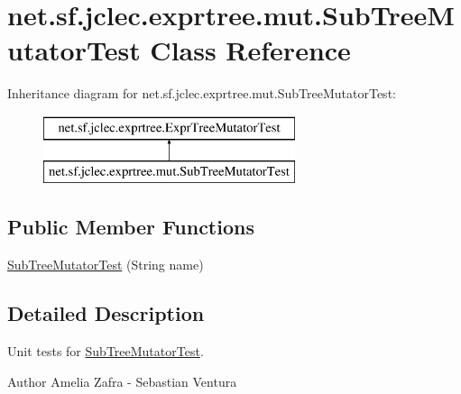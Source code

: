 \hypertarget{classnet_1_1sf_1_1jclec_1_1exprtree_1_1mut_1_1_sub_tree_mutator_test}{\section{net.\-sf.\-jclec.\-exprtree.\-mut.\-Sub\-Tree\-Mutator\-Test Class Reference}
\label{classnet_1_1sf_1_1jclec_1_1exprtree_1_1mut_1_1_sub_tree_mutator_test}
}
Inheritance diagram for net.\-sf.\-jclec.\-exprtree.\-mut.\-Sub\-Tree\-Mutator\-Test\-:\begin{figure}[H]
\begin{center}
\leavevmode
\includegraphics[height=2.000000cm]{classnet_1_1sf_1_1jclec_1_1exprtree_1_1mut_1_1_sub_tree_mutator_test}
\end{center}
\end{figure}
\subsection*{Public Member Functions}
\begin{DoxyCompactItemize}
\item 
\hyperlink{classnet_1_1sf_1_1jclec_1_1exprtree_1_1mut_1_1_sub_tree_mutator_test_aae8d479f853e97cd1beec9196e9aade3}{Sub\-Tree\-Mutator\-Test} (String name)
\end{DoxyCompactItemize}


\subsection{Detailed Description}
Unit tests for \hyperlink{classnet_1_1sf_1_1jclec_1_1exprtree_1_1mut_1_1_sub_tree_mutator_test}{Sub\-Tree\-Mutator\-Test}.

\begin{DoxyAuthor}{Author}
Amelia Zafra -\/ Sebastian Ventura 
\end{DoxyAuthor}


